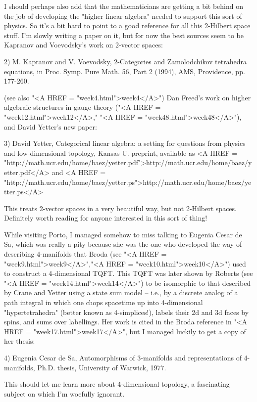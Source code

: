 I should perhaps also add that the mathematicians are getting a bit 
behind on the job of developing the "higher linear algebra" 
needed to support this sort of physics.  So it's a bit hard to point 
to a good reference for all this 2-Hilbert space stuff.  I'm 
slowly writing a paper on it, but for now the best sources seem to be 
Kapranov and Voevodsky's work on 2-vector spaces:

2) M. Kapranov and V. Voevodsky, 2-Categories and
Zamolodchikov tetrahedra equations, in Proc. Symp. Pure
Math. 56, Part 2 (1994), AMS, Providence, pp. 177-260.

(see also "<A HREF = "week4.html">week4</A>") Dan Freed's work on higher algebraic structures in 
gauge theory ("<A HREF = "week12.html">week12</A>," "<A HREF = "week48.html">week48</A>"), and David Yetter's new paper:

3) David Yetter, Categorical linear algebra: a setting for questions
from physics and low-dimensional topology, Kansas U. preprint, available
as <A HREF = "http://math.ucr.edu/home/baez/yetter.pdf">http://math.ucr.edu/home/baez/yetter.pdf</A> and <A HREF = "http://math.ucr.edu/home/baez/yetter.ps">http://math.ucr.edu/home/baez/yetter.ps</A>

This treats 2-vector spaces in a very beautiful way, but not 2-Hilbert spaces.
Definitely worth reading for anyone interested in this sort of thing!

While visiting Porto, I managed somehow to miss talking to Eugenia Cesar
de Sa, which was really a pity because she was the one who developed the
way of describing 4-manifolds that Broda (see "<A HREF = "week9.html">week9</A>","<A HREF = "week10.html">week10</A>") used to 
construct a 4-dimensional TQFT.  This TQFT was later shown by Roberts 
(see "<A HREF = "week14.html">week14</A>") to be isomorphic to that described by Crane and Yetter 
using a state sum model -- i.e., by a discrete analog of a path integral in 
which one chops spacetime up into 4-dimensional "hypertetrahedra" 
(better known as 4-simplices!), labels their 2d and 3d faces by spins, and 
sums over labellings.  Her work is cited in the Broda reference
in "<A HREF = "week17.html">week17</A>", but I managed luckily to get a copy of her thesis:

4) Eugenia Cesar de Sa, Automorphisms of 3-manifolds and representations of 
4-manifolds, Ph.D. thesis, University of Warwick, 1977.  

This should let me learn more about 4-dimensional topology, a fascinating
subject on which I'm woefully ignorant.

